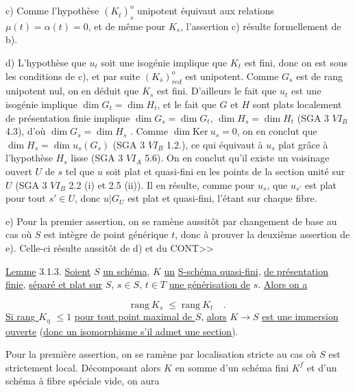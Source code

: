 c)   Comme l'hypothèse $(K_{\overline{t}})^{o}_{s}$ unipotent équivaut aux relations $\mu(t) = \alpha(t) = 0$, et de même pour $K_{s}$, l'assertion c) résulte formellement de b).

d)   L'hypothèse que $u_{t}$ soit une isogénie implique que $K_{t}$ est fini, donc on est sous les conditions de c), et par suite $(K_{\overline{s}})^{o}_{red}$ est unipotent. Comme $G_{s}$ est de rang unipotent nul, on en déduit que $K_{s}$ est fini. D'ailleurs le fait que $u_{t}$ est une isogénie implique $\dim G_{t} = \dim H_{t}$, et le fait que $G$ et $H$ sont plats localement de présentation finie implique $\dim G_{s} = \dim G_{t}$, $\dim H_{s} = \dim H_{t}$ (SGA 3 $VI_{B}$ 4.3), d'où $\dim G_{s} = \dim H_{s}$ . Comme $\dim \mathrm{Ker}\ u_{s} = 0$, on en conclut que $\dim H_{s} = \dim u_{s}(G_{s})$ (SGA 3 $VI_{B}$ 1.2.), ce qui équivaut à $u_{s}$ plat grâce à l'hypothèse $H_{s}$ lisse (SGA 3 $VI_{A}$ 5.6). On en conclut qu'il existe un voisinage ouvert $U$ de $s$ tel que $u$ soit plat et quasi-fini en les points de la section unité sur $U$ (SGA 3 $VI_{B}$ 2.2 (i) et 2.5 (ii)). Il en résulte, comme pour $u_{s}$, que $u_{s'}$ est plat pour tout $s' \in U$, donc $u|G_{U}$ est plat et quasi-fini, l'étant sur chaque fibre.

e)   Pour la premier assertion, on se ramène aussitôt par changement de base au cas où $S$ est intègre de point générique $t$, donc à prouver la deuxième assertion de e). Celle-ci résulte aussitôt de d) et du CONT>>



\underline{Lemme} 3.1.3. \underline{Soient} $S$ \underline{un schéma}, $K$ \underline{un} \underline{S-schéma quasi-fini}, \underline{de présentation finie}, \underline{séparé et plat sur} $S$, $s \in S$, $t \in T$ \underline{une générisation de} $s$. \underline{Alors on a}

\begin{equation*}
\mathrm{rang}\ K_{s} \;\leq\; \mathrm{rang}\ K_{t} \quad .
\end{equation*}
\underline{Si rang $K_{\eta}$} $\leq 1$ \underline{pour tout point maximal de $S$}, \underline{alors} $K \longrightarrow S$ \underline{est une immersion ouverte} (\underline{donc un isomorphisme s'il admet une section}).

Pour la première assertion, on se ramène par localisation stricte au cas où $S$ est strictement local. Décomposant alors $K$ en somme d'un schéma fini $K^{f}$ et d'un schéma à fibre spéciale vide, on aura

